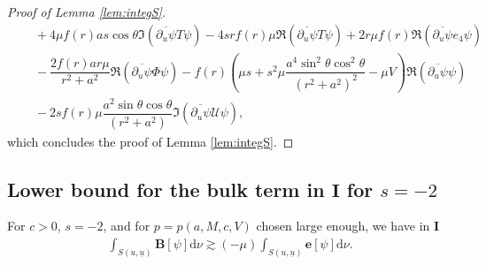 \documentclass[reqno]{amsart}
\numberwithin{equation}{section}
\newcommand{\ubar}{{\underline{u}}}
\newcommand{\dee}{\mathrm{d}}
\newcommand{\ener}{\mathbf{e}}
\newcommand{\un}{\mathbf{I}}
\theoremstyle{plain}
\theoremstyle{definition}
\theoremstyle{remark}
\numberwithin{equation}{section}
\begin{document}
\begin{proof}[Proof of Lemma \ref{lem:integS}]
\begin{align*}
    &\quad+4\mu f(r)as\cos\theta\mathfrak{I}(\overline{\partial_u\psi}T\psi)-4srf(r)\mu\mathfrak{R}(\overline{\partial_u\psi}T\psi)+2r\mu f(r)\mathfrak{R}(\overline{\partial_u\psi}e_4\psi)\\
    &\quad-\dfrac{2f(r)ar\mu}{r^2+a^2}\mathfrak{R}(\overline{\partial_u\psi}\Phi\psi)-f(r)\left(\mu s+s^2\mu\dfrac{a^4\sin^2\theta\cos^2\theta}{(r^2+a^2)^2}-\mu V\right)\mathfrak{R}(\overline{\partial_u\psi}\psi)\\
    &\quad-2sf(r)\mu\dfrac{a^2\sin\theta\cos\theta}{(r^2+a^2)}\mathfrak{I}(\overline{\partial_u\psi}\mathcal{U}\psi),
\end{align*}
which concludes the proof of Lemma \ref{lem:integS}.
\end{proof}
\subsection{Lower bound for the bulk term in $\un$ for $s=-2$}\label{appendix:bulkI}
\begin{lem}\label{lem:bulkpos}
    For $c>0$, $s=-2$, and for $p=p(a,M,c,V)$ chosen large enough, we have in $\un$
    \begin{align}\label{eq:bulkposI}
    \int_{S(u,\ubar)}\mathbf{B}[\psi]\dee\nu\gtrsim (-\mu)\int_{S(u,\ubar)}\ener[\psi]\dee\nu.
\end{align}
\end{lem}
\end{document}
